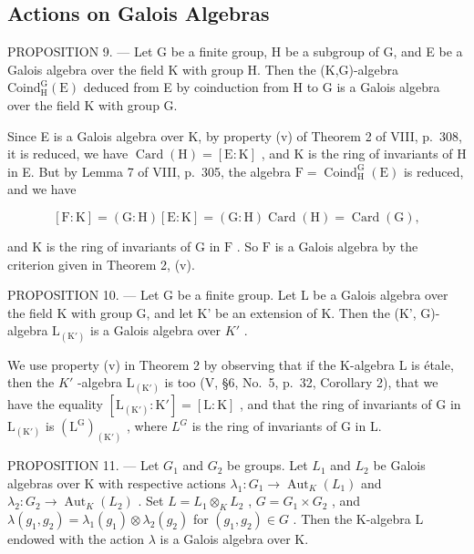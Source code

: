 \subsection{Actions on Galois Algebras}

PROPOSITION 9. --- Let G be a finite group, H be a subgroup of G, and E be a Galois algebra over the field K with group H. Then the (K,G)-algebra \(\mathrm{Coind}_{\mathrm{H}}^{\mathrm{G}}(\mathrm{E})\) deduced from E by coinduction from H to G is a Galois algebra over the field K with group G.

Since E is a Galois algebra over K, by property (v) of Theorem 2 of VIII, p.~308, it is reduced, we have \(\operatorname{Card}(\mathrm{H}) = [\mathrm{E} : \mathrm{K}]\) , and K is the ring of invariants of H in E. But by Lemma 7 of VIII, p.~305, the algebra \(\mathrm{F} = \operatorname{Coind}_{\mathrm{H}}^{\mathrm{G}}(\mathrm{E})\) is reduced, and we have

\[
[ \mathrm{F}: \mathrm{K} ] = (\mathrm{G}: \mathrm{H}) [ \mathrm{E}: \mathrm{K} ] = (\mathrm{G}: \mathrm{H}) \operatorname{Card} (\mathrm{H}) = \operatorname{Card} (\mathrm{G}),
\]

and \(\mathrm{K}\) is the ring of invariants of \(\mathrm{G}\) in \(\mathrm{F}\) . So \(\mathrm{F}\) is a Galois algebra by the criterion given in Theorem 2, (v).

PROPOSITION 10. --- Let G be a finite group. Let L be a Galois algebra over the field K with group G, and let K' be an extension of K. Then the (K', G)-algebra \(\mathrm{L}_{(\mathrm{K}')}\) is a Galois algebra over \(K'\) .

We use property (v) in Theorem 2 by observing that if the K-algebra L is étale, then the \(K'\) -algebra \(\mathrm{L}_{(\mathrm{K}')}\) is too (V, §6, No.~5, p.~32, Corollary 2), that we have the equality \([\mathrm{L}_{(\mathrm{K}')} : \mathrm{K}'] = [\mathrm{L} : \mathrm{K}]\) , and that the ring of invariants of G in \(\mathrm{L}_{(\mathrm{K}')}\) is \((\mathrm{L}^{\mathrm{G}})_{(\mathrm{K}')}\) , where \(L^{G}\) is the ring of invariants of G in L.

PROPOSITION 11. --- Let \(G_{1}\) and \(G_{2}\) be groups. Let \(L_{1}\) and \(L_{2}\) be Galois algebras over K with respective actions \(\lambda_{1}:G_{1}\to\operatorname{Aut}_{K}(L_{1})\) and \(\lambda_{2}:G_{2}\to\operatorname{Aut}_{K}(L_{2})\) . Set \(L=L_{1}\otimes_{K}L_{2}\) , \(G=G_{1}\times G_{2}\) , and \(\lambda(g_{1},g_{2})=\lambda_{1}(g_{1})\otimes\lambda_{2}(g_{2})\) for \((g_{1},g_{2})\in G\) . Then the K-algebra L endowed with the action \(\lambda\) is a Galois algebra over K.


